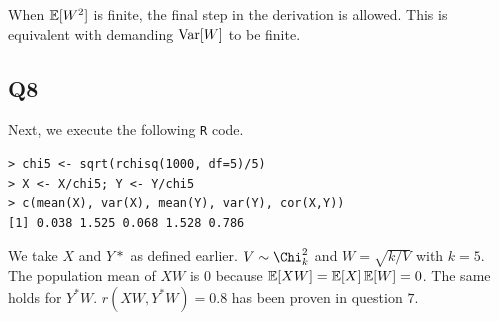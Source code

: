 When $\operatorname{\mathbb{E}}[W^2]$ is finite, the final step in the derivation is allowed. This is equivalent with demanding $\operatorname{\text{Var}}[W]$ to be finite.

\subsection*{Q8}

Next, we execute the following \verb|R| code.

\begin{verbatim}
> chi5 <- sqrt(rchisq(1000, df=5)/5)
> X <- X/chi5; Y <- Y/chi5 
> c(mean(X), var(X), mean(Y), var(Y), cor(X,Y))
[1] 0.038 1.525 0.068 1.528 0.786
\end{verbatim}

We take $X$ and $Y*$ as defined earlier. $V \sim \Chi^2_k$ and $W = \sqrt{k/V}$ with $k=5$.  The population mean of $XW$ is $0$ because $\operatorname{\mathbb{E}}[XW] = \operatorname{\mathbb{E}}[X]\operatorname{\mathbb{E}}[W] = 0$. The same holds for $Y^{*}W$. $r(XW,Y^{*}W) = 0.8$ has been proven in question $7$.
